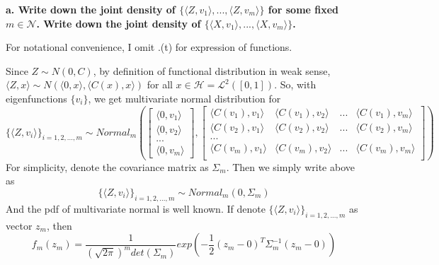 \documentclass{article}
\begin{document}
\textbf{
a. Write down the joint density of $\{\langle Z, v_1\rangle,...,\langle Z, v_m\rangle\}$ for some fixed $m\in\mathcal{N}$.
Write down the joint density of $\{\langle X, v_1\rangle,...,\langle X, v_m\rangle\}$.
}

For notational convenience, I omit .(t) for expression of functions.

Since $Z \sim N(0, C)$, by definition of functional distribution in weak sense,
\(\langle Z, x\rangle \sim N(\langle 0,x \rangle, \langle C(x),x\rangle)\) for all $x\in \mathcal{H}=\mathcal{L}^2([0,1])$.
So, with eigenfunctions $\{v_i\}$, we get multivariate normal distribution for
\[\{\langle Z, v_i\rangle\}_{i=1,2,...,m} \sim Normal_m(
\begin{bmatrix}
    \langle 0,v_1 \rangle \\
    \langle 0,v_2 \rangle \\
    ... \\
    \langle 0,v_m \rangle
\end{bmatrix}
,
\begin{bmatrix}
    \langle C(v_1),v_1 \rangle & \langle C(v_1),v_2 \rangle & ... & \langle C(v_1),v_m \rangle \\
    \langle C(v_2),v_1 \rangle & \langle C(v_2),v_2 \rangle & ... & \langle C(v_2),v_m \rangle \\
    ... \\
    \langle C(v_m),v_1 \rangle & \langle C(v_m),v_2 \rangle & ... & \langle C(v_m),v_m \rangle \\
\end{bmatrix}
)\]
For simplicity, denote the covariance matrix as $\Sigma_m$. Then we simply write above as
\[\{\langle Z, v_i\rangle\}_{i=1,2,...,m} \sim Normal_m(0,\Sigma_m)\]
And the pdf of multivariate normal is well known. 
If denote \(\{\langle Z, v_i\rangle\}_{i=1,2,...,m}\) as vector $z_m$, then
\[
    f_m(z_m) = \frac{1}{(\sqrt{2\pi})^m det(\Sigma_m)}exp{(-\frac{1}{2}(z_m-0)^T\Sigma_m^{-1}(z_m-0))}
\]
\end{document}
